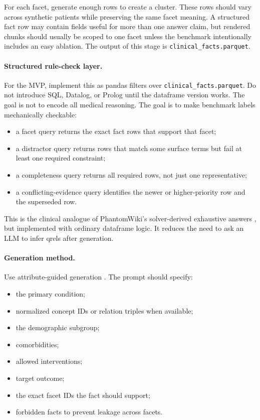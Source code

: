 \documentclass[11pt,a4paper]{article}
\newcommand{\field}[1]{\texttt{#1}}
\begin{document}
For each facet, generate enough rows to create a cluster. These rows should vary across synthetic patients while preserving the same facet meaning. A structured fact row may contain fields useful for more than one answer claim, but rendered chunks should usually be scoped to one facet unless the benchmark intentionally includes an easy ablation. The output of this stage is \field{clinical\_facts.parquet}.

\paragraph{Structured rule-check layer.}
For the MVP, implement this as pandas filters over \field{clinical\_facts.parquet}. Do not introduce SQL, Datalog, or Prolog until the dataframe version works. The goal is not to encode all medical reasoning. The goal is to make benchmark labels mechanically checkable:

\begin{itemize}[leftmargin=*]
	\item a facet query returns the exact fact rows that support that facet;
	\item a distractor query returns rows that match some surface terms but fail at least one required constraint;
	\item a completeness query returns all required rows, not just one representative;
	\item a conflicting-evidence query identifies the newer or higher-priority row and the superseded row.
\end{itemize}

This is the clinical analogue of PhantomWiki's solver-derived exhaustive answers \citep{gong2025phantomwiki}, but implemented with ordinary dataframe logic. It reduces the need to ask an LLM to infer qrels after generation.

\paragraph{Generation method.}
Use attribute-guided generation \citep{huang2025datagen}. The prompt should specify:

\begin{itemize}[leftmargin=*]
	\item the primary condition;
	\item normalized concept IDs or relation triples when available;
	\item the demographic subgroup;
	\item comorbidities;
	\item allowed interventions;
	\item target outcome;
	\item the exact facet IDs the fact should support;
	\item forbidden facts to prevent leakage across facets.
\end{itemize}
\end{document}
